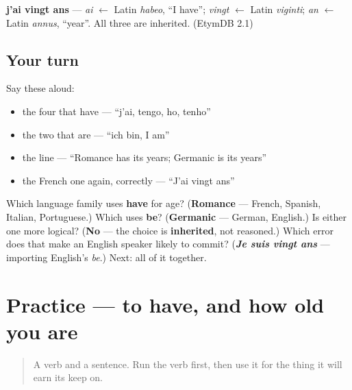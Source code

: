 \begin{cousinweb}
\textbf{j'ai vingt ans} — \emph{ai} $\leftarrow$ Latin \emph{habeo}, \textquotedblleft{}I have\textquotedblright{}; \emph{vingt} $\leftarrow$ Latin \emph{viginti}; \emph{an} $\leftarrow$ Latin \emph{annus}, \textquotedblleft{}year\textquotedblright{}. All three are inherited. (EtymDB 2.1)
\end{cousinweb}

\subsection*{Your turn}
Say these aloud:

\begin{itemize}
\raggedright
  \item the four that have — \textquotedblleft{}j'ai, tengo, ho, tenho\textquotedblright{}
  \item the two that are — \textquotedblleft{}ich bin, I am\textquotedblright{}
  \item the line — \textquotedblleft{}Romance has its years; Germanic is its years\textquotedblright{}
  \item the French one again, correctly — \textquotedblleft{}J'ai vingt ans\textquotedblright{}
\end{itemize}

\begin{tcolorbox}[breakable,colback=teal!4,colframe=teal!35!black,title={Before you move on}]
Which language family uses \textbf{have} for age? (\textbf{Romance} — French, Spanish, Italian, Portuguese.) Which uses \textbf{be}? (\textbf{Germanic} — German, English.) Is either one more logical? (\textbf{No} — the choice is \textbf{inherited}, not reasoned.) Which error does that make an English speaker likely to commit? (\emph{\textbf{Je suis vingt ans}} — importing English's \emph{be}.) Next: all of it together.
\end{tcolorbox}
\section[Practice]{Practice — to have, and how old you are}

\label{lesson:FR-C14-practice}



\begin{quote}
A verb and a sentence. Run the verb first, then use it for the thing it will earn its keep on.
\end{quote}

